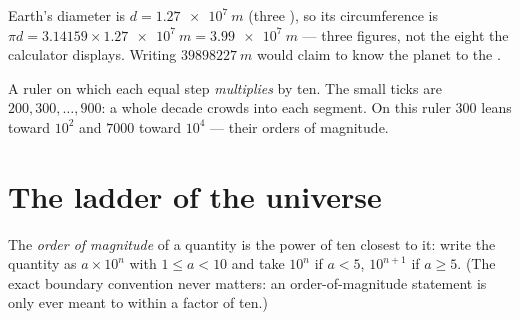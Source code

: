 \begin{example}\label{ex:g10:orders-of-magnitude:sigfig}
Earth's diameter is $d = \qty{1.27e7}{m}$ (three ),
so its circumference is
$\pi d = \num{3.14159} \times \qty{1.27e7}{m} = \qty{3.99e7}{m}$ ---
three figures, not the eight the calculator displays. Writing
$\qty{39898227}{m}$ would claim to know the planet to the .
\end{example}

\begin{omfigure}

{\small A ruler on which each equal step \emph{multiplies} by ten. The
small ticks are $200, 300, \dots, 900$: a whole decade crowds into
each segment. On this ruler $\num{300}$ leans toward $10^{2}$ and
$\num{7000}$ toward $10^{4}$ --- their orders of magnitude.}
\end{omfigure}

\section{The ladder of the universe}

\begin{definition}\label{def:g10:orders-of-magnitude:oom}
The \emph{order of magnitude} of a quantity
is the power of ten closest to it: write the quantity as
$a \times 10^{n}$ with $1 \leq a < 10$ and take $10^{n}$ if $a < 5$,
$10^{n+1}$ if $a \geq 5$. (The exact boundary convention never
matters: an order-of-magnitude statement is only ever meant to within
a factor of ten.)
\end{definition}

